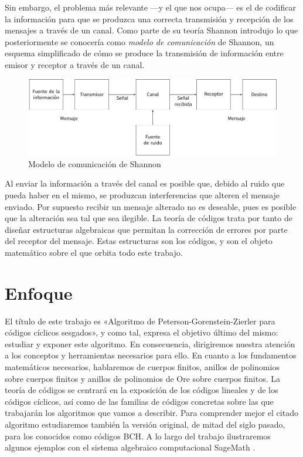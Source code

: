 Sin embargo, el problema más relevante —y el que nos ocupa— es el de codificar la información para que se produzca una correcta transmisión y recepción de los mensajes a través de un canal.
Como parte de su teoría Shannon introdujo lo que posteriormente se conocería como \emph{modelo de comunicación} de Shannon, un esquema simplificado de cómo se produce la transmisión de información entre emisor y receptor a través de un canal.
\begin{figure}
  \includegraphics[width=\textwidth]{assets/shannon-communication-model.pdf}
  \caption*{Modelo de comunicación de Shannon}
\end{figure}
Al enviar la información a través del canal es posible que, debido al ruido que pueda haber en el mismo, se produzcan interferencias que alteren el mensaje enviado.
Por supuesto recibir un mensaje alterado no es deseable, pues es posible que la alteración sea tal que sea ilegible.
La teoría de códigos trata por tanto de diseñar estructuras algebraicas que permitan la corrección de errores por parte del receptor del mensaje.
Estas estructuras son los códigos, y son el objeto matemático sobre el que orbita todo este trabajo.


\section*{Enfoque}

El título de este trabajo es «Algoritmo de Peterson-Gorenstein-Zierler para códigos cíclicos sesgados», y como tal, expresa el objetivo último del mismo: estudiar y exponer este algoritmo.
En consecuencia, dirigiremos nuestra atención a los conceptos y herramientas necesarios para ello.
En cuanto a los fundamentos matemáticos necesarios, hablaremos de cuerpos finitos, anillos de polinomios sobre cuerpos finitos y anillos de polinomios de Ore sobre cuerpos finitos.
La teoría de códigos se centrará en la exposición de los códigos lineales y de los códigos cíclicos, así como de las familias de códigos concretas sobre las que trabajarán los algoritmos que vamos a describir.
Para comprender mejor el citado algoritmo estudiaremos también la versión original, de mitad del siglo pasado, para los conocidos como códigos BCH.
A lo largo del trabajo ilustraremos algunos ejemplos con el sistema algebraico computacional SageMath \parencite{the_sage_developers_sagemath_2020}.

